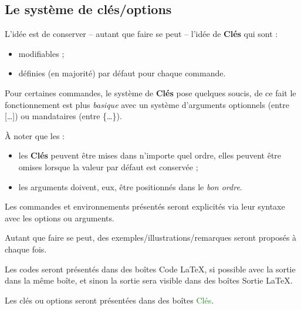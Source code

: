 \documentclass{article}
\newcommand\Cle[1]{{\bfseries\sffamily\textlangle #1\textrangle}}
\begin{document}
\subsection{Le système de \og clés/options \fg}

\begin{codeidee}
L'idée est de conserver -- autant que faire se peut -- l'idée de \Cle{Clés} qui sont :
%
\begin{itemize}
	\item modifiables ;
	\item définies (en majorité) par défaut pour chaque commande.
\end{itemize}

Pour certaines commandes, le système de \Cle{Clés} pose quelques soucis, de ce fait le fonctionnement est plus \textit{basique} avec un système d'\textsf{arguments} optionnels (entre \textsf{[\ldots]}) ou mandataires (entre \textsf{\{\ldots\}}).

\smallskip

À noter que les :
%
\begin{itemize}
	\item les \Cle{Clés} peuvent être mises dans n'importe quel ordre, elles peuvent être omises lorsque la valeur par défaut est conservée ;
	\item les \textsf{arguments} doivent, eux, être positionnés dans le \textit{bon ordre}.
\end{itemize}
\end{codeidee}

\begin{codeinfo}
Les \textsf{commandes} et \textsf{environnements} présentés seront explicités via leur \textsf{syntaxe} avec les \textsf{options} ou \textsf{arguments}.

Autant que faire se peut, des exemples/illustrations/remarques seront proposés à chaque fois.

\smallskip

Les \textsf{codes} seront présentés dans des \textsf{boîtes} \textcolor{red!75!black}{{\small \faCode} Code \LaTeX}, si possible avec la \textsf{sortie} dans la même boîte, et sinon la \textsf{sortie} sera visible dans des \textsf{boîtes} \textcolor{red!75!black}{{\small \faArrowAltCircleRight[regular]} Sortie \LaTeX}.

Les \textsf{clés} ou \textsf{options} seront présentées dans des \textsf{boîtes} \textcolor{ForestGreen}{{\small \faPaperclip} Clés}.
\end{codeinfo}
\end{document}
